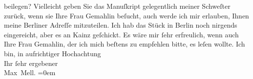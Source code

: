 \begin{ledgroupsized}[t]{13cm}
               beilegen?\pend
           \pstart
           Vielleicht geben Sie das Manuſkript gelegentlich meiner Schweſter zurück, wenn sie Ihre Frau Gemahlin beſucht, auch werde
               ich mir erlauben, Ihnen meine Berliner Adreſſe
               mitzuteilen. Ich hab das Stück
               in Berlin noch nirgends eingereicht, aber es an
                  Kainz geſchickt.\pend
           \pstart
           Es wäre mir ſehr erfreulich, wenn auch Ihre Frau Gemahlin, der ich mich beſtens zu empfehlen bitte, es leſen
               wollte.\pend
           \pstart
           Ich bin, in aufrichtiger Hochachtung{\\[\baselineskip]}Ihr ſehr ergebener{\\[\baselineskip]}\spacefill\mbox{Max Mell.}\pend
           \leftskip=0em{}
         
         \endnumbering{}\end{ledgroupsized}  \newcommand{\dateiname}{L01631}\newcommand{\titel}{Max Mell an Arthur Schnitzler, 11. 10. 1906}\newcommand{\editorInnen}{Martin Anton Müller und Gerd-Hermann Susen}
      